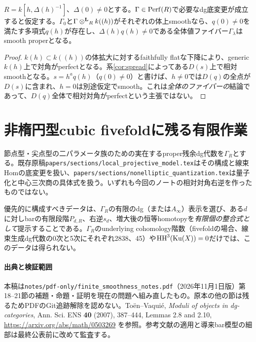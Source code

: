 \begin{corollary}[一変数での条件付きfiberwise結論]\label{cor:onevariable}
$R=k[h,\Delta(h)^{-1}]$、$\Delta(0)\neq0$とする。$\Gamma\in\operatorname{Perf}(R)$で必要なdg底変更が成立すると仮定する。$\Gamma_0$と$\Gamma\mathbin{\otimes^{\mathbf L}}_Rk((h))$がそれぞれの体上smoothなら、$q(0)\neq0$を満たす多項式$q(h)$が存在し、$\Delta(h)q(h)\neq0$である全体値ファイバー$\Gamma_\lambda$はsmooth properとなる。
\end{corollary}
\begin{proof}
$k(h)\subset k((h))$の体拡大に対するfaithfully flatな下降により、generic $k(h)$上で対角がperfectとなる。系\ref{cor:spread}によってある$D(s)$上で相対smoothとなる。$s=h^a q(h)$（$q(0)\neq0$）と書けば、$h\neq0$では$D(q)$の全点が$D(s)$に含まれ、$h=0$は別途仮定でsmooth。これは\emph{全体のファイバーの}結論であって、$D(q)$全体で相対対角がperfectという主張ではない。
\end{proof}

\section{非楕円型cubic fivefoldに残る有限作業}
節点型・尖点型の二パラメータ族のための実在するproper残余dg代数を$\Gamma_R$とする。既存原稿\texttt{papers/sections/local\_projective\_model.tex}はその構成と線束Homの底変更を扱い、\texttt{papers/sections/nonelliptic\_quantization.tex}は量子化と中心三次商の具体式を扱う。いずれも今回のノートの相対対角右逆を作ったものではない。

優先的に構成すべきデータは、$\Gamma_R$の有限のdg（または$A_\infty$）表示を選び、ある$d$に対しbarの有限段階$P_{d,R}$、右逆$s_d$、増大後の恒等homotopyを\emph{有限個の整合式として}提示することである。$\Gamma_R$のunderlying cohomology階数（fivefoldの場合、線束生成dg代数の0次と5次にそれぞれ2838、45）や\(\operatorname{HH}^3(\operatorname{Ku}(X))=0\)だけでは、このデータは得られない。

\paragraph{出典と検証範囲}
本稿は\texttt{notes/pdf-only/finite\_smoothness\_notes.pdf}（2026年11月1日版）第18--21節の補題・命題・証明を現在の問題へ組み直したもの。原本の他の節は残るためPDFのGit追跡解除を認めない。Toën--Vaquié, \emph{Moduli of objects in dg-categories}, Ann. Sci. ENS \textbf{40} (2007), 387--444, Lemmas 2.8 and 2.10, \url{https://arxiv.org/abs/math/0503269} を参照。参考文献の適用と導来bar模型の細部は最終公表前に改めて監査する。
